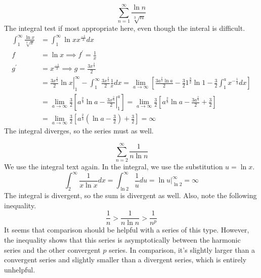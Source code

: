 \documentclass[fleqn,letterpaper]{report}
\begin{document}
\begin{example}
\begin{equation*}
\sum_{n=1}^\infty \frac{\ln n}{\sqrt[3]{n}}
\end{equation*}
The integral test if most appropriate here, even though the
interal is difficult.
\begin{align*}
\int_1^\infty \frac{\ln x}{\sqrt[3]{x}} & = \int_1^\infty \ln x
x^{\frac{-1}{3}} dx \\
f & = \ln x \implies f^\prime = \frac{1}{x} \\
g^\prime & = x^\frac{-1}{3} \implies g = \frac{3x^{\frac{2}{3}}}{2} \\
& = \left. \frac{3x^{\frac{2}{3}}}{2} \ln x \right|_1^\infty -
\int_1^\infty \frac{3x^{\frac{2}{3}}}{2} \frac{1}{x} dx 
= \lim_{a \rightarrow \infty} \left[ \frac{3a^{\frac{2}{3}}
\ln a}{2} - \frac{3}{2} 1^{\frac{3}{2}} \ln 1 - \frac{3}{2}
\int_1^a x^{-\frac{1}{3}} dx \right] \\
& = \lim_{a \rightarrow \infty} \frac{3}{2} \left[
a^{\frac{2}{3}} \ln a - \left. \frac{3x^{\frac{2}{3}}}{2}
\right|_1^a \right] 
= \lim_{a \rightarrow \infty} \frac{3}{2}\left[
a^{\frac{2}{3}} \ln a - \frac{3a^{\frac{2}{3}}}{2} + \frac{3}{2}
\right] \\
& = \lim_{a \rightarrow \infty} \frac{3}{2} \left[
a^{\frac{2}{3}} \left( \ln a - \frac{3}{2} \right) + \frac{3}{2}
\right] = \infty
\end{align*}
The integral diverges, so the series must as well.
\end{example}

\begin{example}
\begin{equation*}
\sum_{n=2}^\infty \frac{1}{n \ln n}
\end{equation*}
We use the integral text again. In the integral, we use the
substitution $u = \ln x$.
\begin{equation*}
\int_2^\infty \frac{1}{x \ln x} dx = \int_{\ln 2}^\infty
\frac{1}{u} du 
=  \ln u \Big|_{\ln 2}^\infty = \infty 
\end{equation*}
The integral is divergent, so the sum is divergent as well.
Also, note the following inequality. 
\begin{equation*}
\frac{1}{n} > \frac{1}{n \ln n} > \frac{1}{n^p}
\end{equation*}
It seems that comparison should be helpful with a series of
this type. However, the inequality shows that this series is
asymptotically between the harmonic series and the other
convergent $p$ series. In comparison, it's slightly larger
than a convergent series and slightly smaller than a divergent
series, which is entirely unhelpful. 

\end{example}
\end{document}
